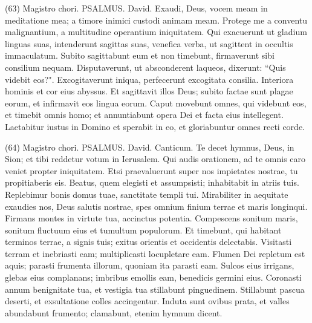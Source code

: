 \begin{biblechapter}  (63) 
\verse  Magistro chori. PSALMUS. David. 
\verse Exaudi, Deus, vocem meam in meditatione mea; a timore inimici custodi animam meam. 
\verse Protege me a conventu malignantium, a multitudine operantium iniquitatem. 
\verse Qui exacuerunt ut gladium linguas suas, intenderunt sagittas suas, venefica verba, 
\verse ut sagittent in occultis immaculatum. Subito sagittabunt eum et non timebunt, 
\verse firmaverunt sibi consilium nequam. Disputaverunt, ut absconderent laqueos, dixerunt: “Quis videbit eos?". 
\verse Excogitaverunt iniqua, perfecerunt excogitata consilia. Interiora hominis et cor eius abyssus. 
\verse Et sagittavit illos Deus; subito factae sunt plagae eorum, 
\verse et infirmavit eos lingua eorum. Caput movebunt omnes, qui videbunt eos, 
\verse et timebit omnis homo; et annuntiabunt opera Dei et facta eius intellegent. 
\verse Laetabitur iustus in Domino et sperabit in eo, et gloriabuntur omnes recti corde. 
\end{biblechapter}

\begin{biblechapter}  (64) 
\verse  Magistro chori. PSALMUS. David. Canticum. 
\verse Te decet hymnus, Deus, in Sion; et tibi reddetur votum in Ierusalem. 
\verse Qui audis orationem, ad te omnis caro veniet propter iniquitatem. 
\verse Etsi praevaluerunt super nos impietates nostrae, tu propitiaberis eis. 
\verse Beatus, quem elegisti et assumpsisti; inhabitabit in atriis tuis. Replebimur bonis domus tuae, sanctitate templi tui. 
\verse Mirabiliter in aequitate exaudies nos, Deus salutis nostrae, spes omnium finium terrae et maris longinqui. 
\verse Firmans montes in virtute tua, accinctus potentia. 
\verse Compescens sonitum maris, sonitum fluctuum eius et tumultum populorum. 
\verse Et timebunt, qui habitant terminos terrae, a signis tuis; exitus orientis et occidentis delectabis. 
\verse Visitasti terram et inebriasti eam; multiplicasti locupletare eam. Flumen Dei repletum est aquis; parasti frumenta illorum, quoniam ita parasti eam. 
\verse Sulcos eius irrigans, glebas eius complanans; imbribus emollis eam, benedicis germini eius. 
\verse Coronasti annum benignitate tua, et vestigia tua stillabunt pinguedinem. 
\verse Stillabunt pascua deserti, et exsultatione colles accingentur. 
\verse Induta sunt ovibus prata, et valles abundabunt frumento; clamabunt, etenim hymnum dicent. 
\end{biblechapter}

